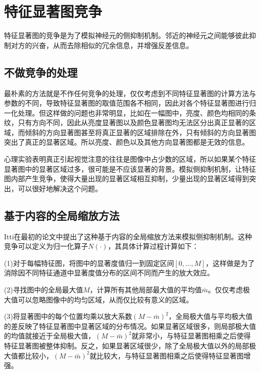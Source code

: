\documentclass[a4paper,12pt]{article}
\begin{document}

\section{特征显著图竞争}

特征显著图的竞争是为了模拟神经元的侧抑制机制。邻近的神经元之间能够彼此抑制对方的兴奋，从而去除相似的冗余信息，并增强反差信息。

\subsection{不做竞争的处理}

最朴素的方法就是不作任何竞争的处理，仅仅考虑到不同特征显著图的计算方法与参数的不同，导致特征显著图的取值范围各不相同，因此对各个特征显著图进行归一化处理。但这样做的问题也非常明显，比如在一幅图中，亮度、颜色均相同的条纹，只有方向不同，因此从亮度显著图以及颜色显著图均无法区分出真正显著的区域，而倾斜的方向显著图甚至将真正显著的区域排除在外，只有倾斜的方向显著图突出了真正的显著区域。所以亮度、颜色以及其他方向显著图都是无效的信息。


心理实验表明真正引起视觉注意的往往是图像中占少数的区域，所以如果某个特征显著图中的显著区域过多，很可能是不应该显著的背景。模拟侧抑制机制，让特征图内部产生竞争，使得大量出现的显著区域相互抑制，少量出现的显著区域得到突出，可以很好地解决这个问题。

\subsection{基于内容的全局缩放方法}

Itti在最初的论文中提出了这种基于内容的全局缩放方法来模拟侧抑制机制。这种竞争可以定义为归一化算子$N(\cdot)$，其具体计算过程计算如下：


(1)对于每幅特征图，将图中的显著度值归一到固定区间$[0,\ldots,M]$，这样做是为了消除因不同特征通道中显著度值分布的区间不同而产生的放大效应。


(2)寻找图中的全局最大值$M$，计算所有其他局部最大值的平均值$\bar{m}$。仅仅考虑极大值可以忽略图像中的均匀区域，从而仅比较有意义的区域。


(3)将显著图中的每个位置均乘以放大系数$(M-\bar{m})^2$，全局极大值与平均极大值的差反映了特征显著图中显著区域的分布情况。如果显著区域很多，则局部极大值的均值就接近于全局极大值，$(M-\bar{m})^2$就非常小，与特征显著图相乘之后使得特征显著图被整体抑制。反之，如果显著区域很少，除了全局极大值以外的局部极大值都比较小，$(M-\bar{m})^2$就比较大，与特征显著图相乘之后使得特征显著图增强。
\end{document}
